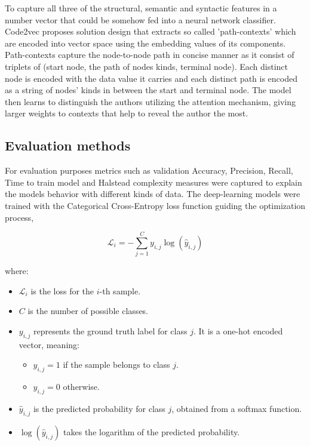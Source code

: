 \documentclass[conference]{IEEEtran}
\begin{document}
To capture all three of the structural, semantic and syntactic features in a number vector that could be somehow fed into a neural network classifier. 
Code2vec \citet{code2vec} proposes solution design that extracts so called 'path-contexts' which are encoded into vector space using the embedding values 
of its components.
Path-contexts capture the node-to-node path in concise manner as it consist of triplets of (start node, the path of nodes kinds, terminal node).
Each distinct node is encoded with the data value it carries and each distinct path is encoded as a string of nodes' kinds in between the start and terminal node.
The model then learns to distinguish the authors utilizing the attention mechanism, giving larger weights to contexts that help to reveal the author the most.



\subsection{Evaluation methods}
For evaluation purposes metrics such as validation Accuracy, Precision, Recall, Time to train model and Halstead complexity measures were captured to explain the models
behavior with different kinds of data. The deep-learning models were trained with the Categorical Cross-Entropy loss function guiding the optimization process,

\begin{equation}
    \mathcal{L}_i = - \sum_{j=1}^{C} y_{i,j} \log(\hat{y}_{i,j})
\end{equation}

where:
\begin{itemize}
    \item $\mathcal{L}_i$ is the loss for the $i$-th sample.
    \item $C$ is the number of possible classes.
    \item $y_{i,j}$ represents the ground truth label for class $j$. It is a one-hot encoded vector, meaning:
    \begin{itemize}
        \item $y_{i,j} = 1$ if the sample belongs to class $j$.
        \item $y_{i,j} = 0$ otherwise.
    \end{itemize}
    \item $\hat{y}_{i,j}$ is the predicted probability for class $j$, obtained from a softmax function.
    \item $\log(\hat{y}_{i,j})$ takes the logarithm of the predicted probability.
\end{itemize}
\end{document}
